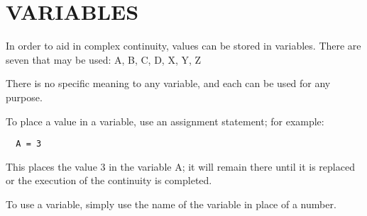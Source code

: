 \section{VARIABLES}\label{variables}

In order to aid in complex continuity, values can be stored in variables.
There are seven that may be used:
  A, B, C, D, X, Y, Z

There is no specific meaning to any variable, and each can be used for any
purpose.

To place a value in a variable, use an assignment statement; for example:
\begin{verbatim}
  A = 3
\end{verbatim}
This places the value 3 in the variable A; it will remain there until it is
replaced or the execution of the continuity is completed.

To use a variable, simply use the name of the variable in place of a number.

